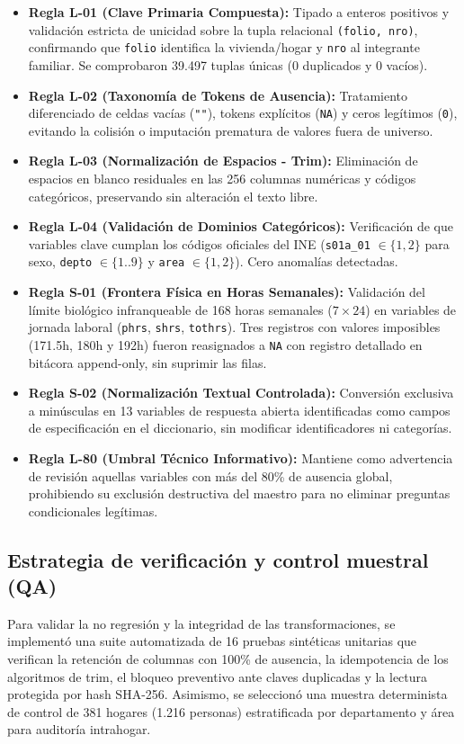 \begin{itemize}[leftmargin=0.5in]
  \item \textbf{Regla L-01 (Clave Primaria Compuesta):} Tipado a enteros positivos y validación estricta de unicidad sobre la tupla relacional \texttt{(folio, nro)}, confirmando que \texttt{folio} identifica la vivienda/hogar y \texttt{nro} al integrante familiar. Se comprobaron 39.497 tuplas únicas (0 duplicados y 0 vacíos).
  \item \textbf{Regla L-02 (Taxonomía de Tokens de Ausencia):} Tratamiento diferenciado de celdas vacías (\texttt{""}), tokens explícitos (\texttt{NA}) y ceros legítimos (\texttt{0}), evitando la colisión o imputación prematura de valores fuera de universo.
  \item \textbf{Regla L-03 (Normalización de Espacios - Trim):} Eliminación de espacios en blanco residuales en las 256 columnas numéricas y códigos categóricos, preservando sin alteración el texto libre.
  \item \textbf{Regla L-04 (Validación de Dominios Categóricos):} Verificación de que variables clave cumplan los códigos oficiales del INE (\texttt{s01a\_01} $\in \{1,2\}$ para sexo, \texttt{depto} $\in \{1..9\}$ y \texttt{area} $\in \{1,2\}$). Cero anomalías detectadas.
  \item \textbf{Regla S-01 (Frontera Física en Horas Semanales):} Validación del límite biológico infranqueable de 168 horas semanales ($7 \times 24$) en variables de jornada laboral (\texttt{phrs}, \texttt{shrs}, \texttt{tothrs}). Tres registros con valores imposibles (171.5h, 180h y 192h) fueron reasignados a \texttt{NA} con registro detallado en bitácora append-only, sin suprimir las filas.
  \item \textbf{Regla S-02 (Normalización Textual Controlada):} Conversión exclusiva a minúsculas en 13 variables de respuesta abierta identificadas como campos de especificación en el diccionario, sin modificar identificadores ni categorías.
  \item \textbf{Regla L-80 (Umbral Técnico Informativo):} Mantiene como advertencia de revisión aquellas variables con más del 80\% de ausencia global, prohibiendo su exclusión destructiva del maestro para no eliminar preguntas condicionales legítimas.
\end{itemize}

\subsection{Estrategia de verificación y control muestral (QA)}
Para validar la no regresión y la integridad de las transformaciones, se implementó una suite automatizada de 16 pruebas sintéticas unitarias que verifican la retención de columnas con 100\% de ausencia, la idempotencia de los algoritmos de trim, el bloqueo preventivo ante claves duplicadas y la lectura protegida por hash SHA-256. Asimismo, se seleccionó una muestra determinista de control de 381 hogares (1.216 personas) estratificada por departamento y área para auditoría intrahogar.
